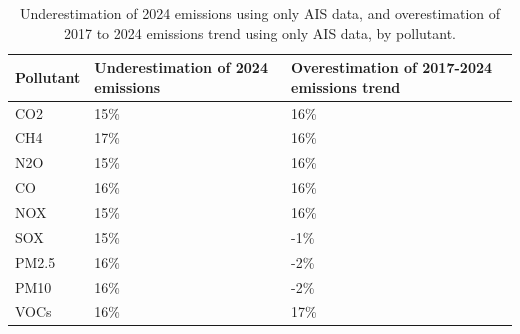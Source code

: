 \begin{table}[!h]
\centering
\caption{\label{tab:pollutant_ais_underestimation_overestimation_summary}Underestimation of 2024 emissions using only AIS data, and overestimation of 2017 to 2024 emissions trend using only AIS data, by pollutant.}
\centering
\fontsize{8}{10}\selectfont
\begin{tabular}[t]{l|l|l}
\hline
Pollutant & Underestimation of 2024 emissions & Overestimation of 2017-2024 emissions trend\\
\hline
CO2 & 15\% & 16\%\\
\hline
CH4 & 17\% & 16\%\\
\hline
N2O & 15\% & 16\%\\
\hline
CO & 16\% & 16\%\\
\hline
NOX & 15\% & 16\%\\
\hline
SOX & 15\% & -1\%\\
\hline
PM2.5 & 16\% & -2\%\\
\hline
PM10 & 16\% & -2\%\\
\hline
VOCs & 16\% & 17\%\\
\hline
\end{tabular}
\end{table}
